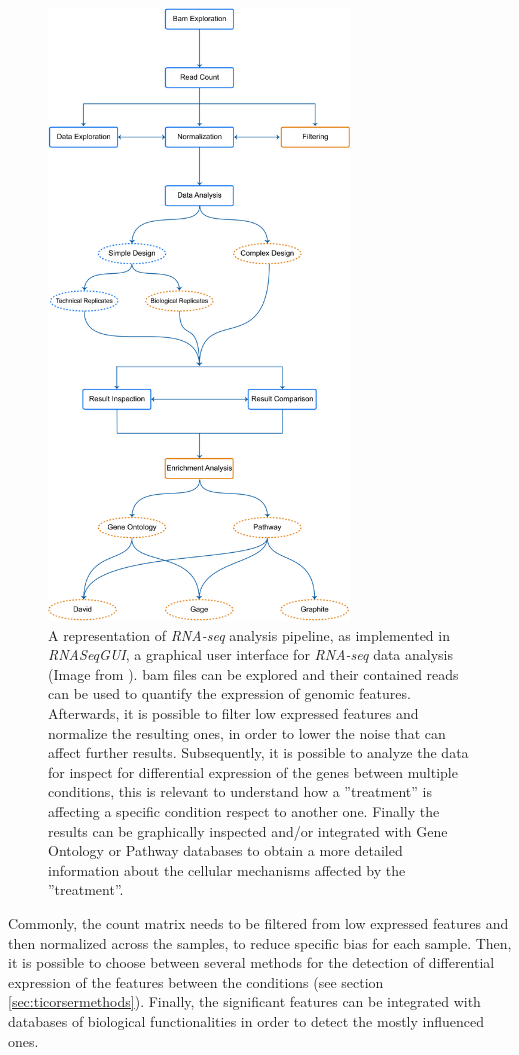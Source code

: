 \begin{figure}[H]
\centering
\includegraphics[width=8cm, keepaspectratio]{img/intro/rnaseqgui1.pdf}
\caption[RNA-seq pipeline]{A representation of \textit{RNA-seq} analysis pipeline, as implemented in \textit{RNASeqGUI}, a graphical user interface for \textit{RNA-seq} data analysis (Image from \cite{RussoRighelli2016}).
\gls{bam} files can be explored and their contained reads can be used to quantify the expression of genomic features.
Afterwards, it is possible to filter low expressed features and normalize the resulting ones, in order to lower the noise that can affect further results.
Subsequently, it is possible to analyze the data for inspect for differential expression of the genes between multiple conditions, this is relevant to understand how a ''treatment'' is affecting a specific condition respect to another one.
Finally the results can be graphically inspected and/or integrated with Gene Ontology or Pathway databases to obtain a more detailed information about the cellular mechanisms affected by the ''treatment''.}
\label{fig:rnaseqan}
\end{figure}

Commonly, the count matrix needs to be filtered from low expressed features and then normalized across the samples, to reduce specific bias for each sample.
Then, it is possible to choose between several methods for the detection of differential expression of the features between the conditions (see section \ref{sec:ticorsermethods}).
Finally, the significant features can be integrated with databases of biological functionalities in order to detect the mostly influenced ones.

